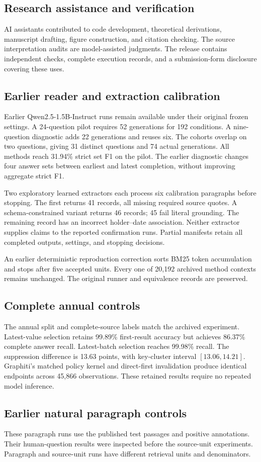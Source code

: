 \subsection{Research assistance and verification}
AI assistants contributed to code development, theoretical derivations, manuscript drafting, figure construction, and citation checking.
The source interpretation audits are model-assisted judgments.
The release contains independent checks, complete execution records, and a submission-form disclosure covering these uses.

\subsection{Earlier reader and extraction calibration}
Earlier Qwen2.5-1.5B-Instruct runs remain available under their original frozen settings.
A 24-question pilot requires 52 generations for 192 conditions.
A nine-question diagnostic adds 22 generations and reuses six.
The cohorts overlap on two questions, giving 31 distinct questions and 74 actual generations.
All methods reach 31.94\% strict set F1 on the pilot.
The earlier diagnostic changes four answer sets between earliest and latest completion, without improving aggregate strict F1.

Two exploratory learned extractors each process six calibration paragraphs before stopping.
The first returns 41 records, all missing required source quotes.
A schema-constrained variant returns 46 records; 45 fail literal grounding.
The remaining record has an incorrect holder--date association.
Neither extractor supplies claims to the reported confirmation runs.
Partial manifests retain all completed outputs, settings, and stopping decisions.

An earlier deterministic reproduction correction sorts BM25 token accumulation and stops after five accepted units.
Every one of 20,192 archived method contexts remains unchanged.
The original runner and equivalence records are preserved.

\subsection{Complete annual controls}


The annual split and complete-source labels match the archived experiment.
Latest-value selection retains 99.89\% first-result accuracy but achieves 86.37\% complete answer recall.
Latest-batch selection reaches 99.98\% recall.
The suppression difference is 13.63 points, with key-cluster interval $[13.06,14.21]$.
Graphiti's matched policy kernel and direct-first invalidation produce identical endpoints across 45,866 observations.
These retained results require no repeated model inference.

\subsection{Earlier natural paragraph controls}

These paragraph runs use the published test passages and positive annotations.
Their human-question results were inspected before the source-unit experiments.
Paragraph and source-unit runs have different retrieval units and denominators.
